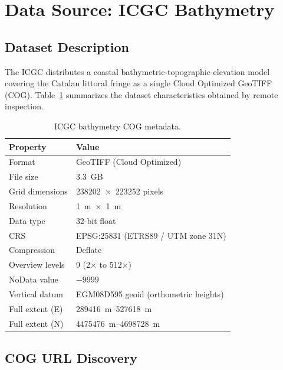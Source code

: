 \documentclass[a4paper,11pt]{article}
\begin{document}
\section{Data Source: ICGC Bathymetry}
\label{sec:data}

\subsection{Dataset Description}

The ICGC distributes a coastal bathymetric-topographic elevation model covering the Catalan
littoral fringe as a single Cloud Optimized GeoTIFF (COG). Table~\ref{tab:metadata}
summarizes the dataset characteristics obtained by remote inspection.

\begin{table}[ht]
\centering
\caption{ICGC bathymetry COG metadata.}
\label{tab:metadata}
\begin{tabular}{@{}ll@{}}
\toprule
Property        & Value \\
\midrule
Format          & GeoTIFF (Cloud Optimized) \\
File size       & \SI{3.3}{GB} \\
Grid dimensions & \num{238202}~$\times$~\num{223252} pixels \\
Resolution      & \SI{1}{m}~$\times$~\SI{1}{m} \\
Data type       & 32-bit float \\
CRS             & EPSG:25831 (ETRS89 / UTM zone 31N) \\
Compression     & Deflate \\
Overview levels & 9 (2$\times$ to 512$\times$) \\
NoData value    & $-9999$ \\
Vertical datum  & EGM08D595 geoid (orthometric heights) \\
Full extent (E) & \SIrange{289416}{527618}{m} \\
Full extent (N) & \SIrange{4475476}{4698728}{m} \\
\bottomrule
\end{tabular}
\end{table}

\subsection{COG URL Discovery}
\end{document}
